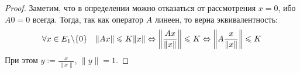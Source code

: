 \begin{proof}
	Заметим, что в определении можно отказаться от рассмотрения $x = 0$, ибо $A0 = 0$ всегда. Тогда, так как оператор $A$ линеен, то верна эквивалентность:
	\[
		\forall x \in E_1 \backslash \{0\}\quad \|Ax\| \leqslant K\|x\| \Leftrightarrow \left\|\frac{Ax}{\|x\|}\right\| \leqslant K \Leftrightarrow \left\|A\frac{x}{\|x\|}\right\| \leqslant K
	\]
	При этом $y := \frac{x}{\|x\|}$, $\|y\| = 1$.
\end{proof}